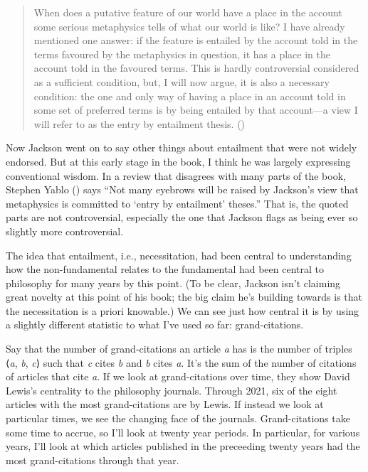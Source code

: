 \documentclass[
  12pt,
  letterpaper,
  DIV=11,
  numbers=noendperiod]{scrartcl}
\begin{document}
\begin{quote}
When does a putative feature of our world have a place in the account
some serious metaphysics tells of what our world is like? I have already
mentioned one answer: if the feature is entailed by the account told in
the terms favoured by the metaphysics in question, it has a place in the
account told in the favoured terms. This is hardly controversial
considered as a sufficient condition, but, I will now argue, it is also
a necessary condition: the one and only way of having a place in an
account told in some set of preferred terms is by being entailed by that
account---a view I will refer to as the entry by entailment thesis.
()
\end{quote}

Now Jackson went on to say other things about entailment that were not
widely endorsed. But at this early stage in the book, I think he was
largely expressing conventional wisdom. In a review that disagrees with
many parts of the book, Stephen Yablo
() says ``Not many eyebrows
will be raised by Jackson's view that metaphysics is committed to `entry
by entailment' theses.'' That is, the quoted parts are not
controversial, especially the one that Jackson flags as being ever so
slightly more controversial.

The idea that entailment, i.e., necessitation, had been central to
understanding how the non-fundamental relates to the fundamental had
been central to philosophy for many years by this point. (To be clear,
Jackson isn't claiming great novelty at this point of his book; the big
claim he's building towards is that the necessitation is a priori
knowable.) We can see just how central it is by using a slightly
different statistic to what I've used so far: grand-citations.

Say that the number of grand-citations an article \emph{a} has is the
number of triples ⟨\emph{a}, \emph{b}, \emph{c}⟩ such that \emph{c}
cites \emph{b} and \emph{b} cites \emph{a}. It's the sum of the number
of citations of articles that cite \emph{a}. If we look at
grand-citations over time, they show David Lewis's centrality to the
philosophy journals. Through 2021, six of the eight articles with the
most grand-citations are by Lewis. If instead we look at particular
times, we see the changing face of the journals. Grand-citations take
some time to accrue, so I'll look at twenty year periods. In particular,
for various years, I'll look at which articles published in the
preceeding twenty years had the most grand-citations through that year.
\end{document}
